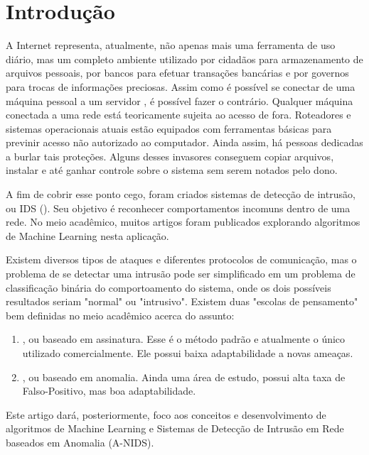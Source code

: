 \chapter{Introdução}
\label{introducao}

A Internet representa, atualmente, não apenas mais uma ferramenta de uso diário, mas um completo ambiente utilizado por
cidadãos para armazenamento de arquivos pessoais, por bancos para efetuar transações bancárias e por governos para
trocas de informações preciosas.
Assim como é possível se conectar de uma máquina pessoal a um servidor , é possível fazer o contrário.
Qualquer máquina conectada a uma rede está teoricamente sujeita ao acesso de fora.
Roteadores e sistemas operacionais atuais estão equipados com ferramentas básicas para previnir acesso não autorizado
ao computador. Ainda assim, há pessoas dedicadas a burlar tais proteções. Alguns desses invasores conseguem copiar
arquivos, instalar  e até ganhar controle sobre o sistema sem serem notados pelo dono.
\par A fim de cobrir esse ponto cego, foram criados sistemas de detecção de intrusão, ou IDS
(). Seu objetivo é reconhecer comportamentos incomuns dentro de uma rede.
No meio acadêmico, muitos artigos foram publicados explorando algoritmos de Machine Learning nesta aplicação.
\par Existem diversos tipos de ataques e diferentes protocolos de comunicação, mas o problema de se detectar uma
intrusão pode ser simplificado em um problema de classificação binária do comportoamento do sistema, onde os dois
possíveis resultados seriam "normal" ou "intrusivo". Existem duas "escolas de pensamento" bem definidas no meio
acadêmico acerca do assunto:
\begin{enumerate}
    \item {}, ou baseado em assinatura. Esse é o método padrão e atualmente o único utilizado
    comercialmente. Ele possui baixa adaptabilidade a novas ameaças.
    \item {}, ou baseado em anomalia. Ainda uma área de estudo, possui alta taxa de
    Falso-Positivo, mas boa adaptabilidade.
\end{enumerate}
Este artigo dará, posteriormente, foco aos conceitos e desenvolvimento de algoritmos de Machine Learning e Sistemas de
Detecção de Intrusão em Rede baseados em Anomalia (A-NIDS).
